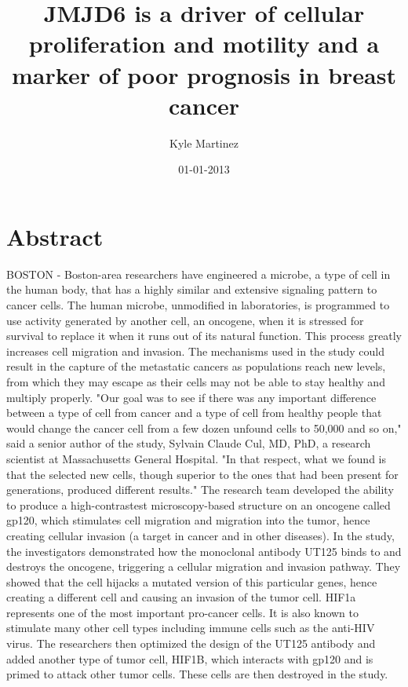 \documentclass{article}%
\title{JMJD6 is a driver of cellular proliferation and motility and a marker of poor prognosis in breast cancer}%
\author{Kyle Martinez}%
\affil{Department of Gastroenterology, Justus Liebig University, Giessen, Germany}%
\date{01{-}01{-}2013}%
\begin{document}
%
\normalsize%
\maketitle%
\section{Abstract}%
\label{sec:Abstract}%
BOSTON {-} Boston{-}area researchers have engineered a microbe, a type of cell in the human body, that has a highly similar and extensive signaling pattern to cancer cells.\newline%
The human microbe, unmodified in laboratories, is programmed to use activity generated by another cell, an oncogene, when it is stressed for survival to replace it when it runs out of its natural function. This process greatly increases cell migration and invasion. The mechanisms used in the study could result in the capture of the metastatic cancers as populations reach new levels, from which they may escape as their cells may not be able to stay healthy and multiply properly.\newline%
"Our goal was to see if there was any important difference between a type of cell from cancer and a type of cell from healthy people that would change the cancer cell from a few dozen unfound cells to 50,000 and so on," said a senior author of the study, Sylvain Claude Cul, MD, PhD, a research scientist at Massachusetts General Hospital. "In that respect, what we found is that the selected new cells, though superior to the ones that had been present for generations, produced different results."\newline%
The research team developed the ability to produce a high{-}contrastest microscopy{-}based structure on an oncogene called gp120, which stimulates cell migration and migration into the tumor, hence creating cellular invasion (a target in cancer and in other diseases). In the study, the investigators demonstrated how the monoclonal antibody UT125 binds to and destroys the oncogene, triggering a cellular migration and invasion pathway. They showed that the cell hijacks a mutated version of this particular genes, hence creating a different cell and causing an invasion of the tumor cell.\newline%
HIF1a represents one of the most important pro{-}cancer cells. It is also known to stimulate many other cell types including immune cells such as the anti{-}HIV virus.\newline%
The researchers then optimized the design of the UT125 antibody and added another type of tumor cell, HIF1B, which interacts with gp120 and is primed to attack other tumor cells. These cells are then destroyed in the study.\newline%
\end{document}
